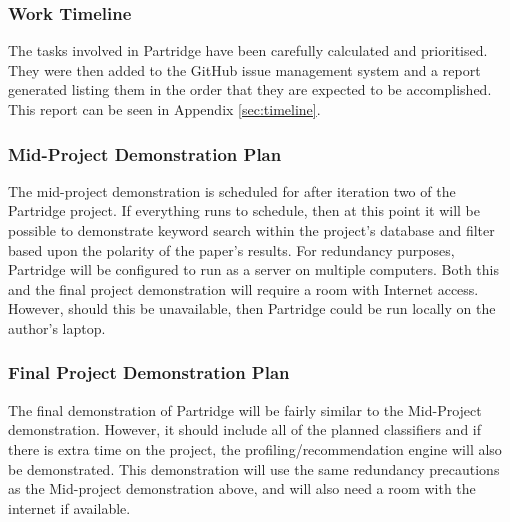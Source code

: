 \documentclass[12pt,a4paper]{article}
\begin{document}
\subsubsection{ Work Timeline }

The tasks involved in Partridge have been carefully calculated and prioritised.
They were then added to the GitHub issue management system and a report
generated listing them in the order that they are expected to be
accomplished. This report can be seen in Appendix \ref{sec:timeline}. 


\subsubsection{ Mid-Project Demonstration Plan}

The mid-project demonstration is scheduled for after iteration two of the
Partridge project. If everything runs to schedule, then at this point it will
be possible to demonstrate keyword search within the project's database and
filter based upon the polarity of the paper's results. For redundancy purposes,
Partridge will be configured to run as a server on multiple computers. Both
this and the final project demonstration will require a room with Internet
access. However, should this be unavailable, then Partridge could be run
locally on the author's laptop.

\subsubsection{ Final Project Demonstration Plan}

The final demonstration of Partridge will be fairly similar to the Mid-Project
demonstration. However, it should include all of the planned classifiers and if
there is extra time on the project, the profiling/recommendation engine will
also be demonstrated. This demonstration will use the same redundancy
precautions as the Mid-project demonstration above, and will also need a room
with the internet if available.




\pagebreak


\end{document}
